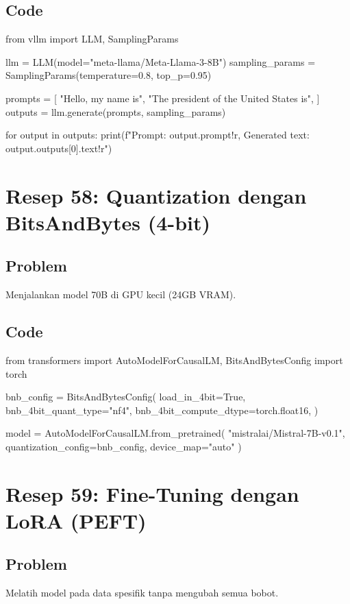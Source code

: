 \subsection*{Code}
\begin{codeblock}[language=Python]
from vllm import LLM, SamplingParams

llm = LLM(model="meta-llama/Meta-Llama-3-8B")
sampling_params = SamplingParams(temperature=0.8, top_p=0.95)

prompts = [
    "Hello, my name is",
    "The president of the United States is",
]
outputs = llm.generate(prompts, sampling_params)

for output in outputs:
    print(f"Prompt: {output.prompt!r}, Generated text: {output.outputs[0].text!r}")
\end{codeblock}

\newpage

\section{Resep 58: Quantization dengan BitsAndBytes (4-bit)}

\subsection*{Problem}
Menjalankan model 70B di GPU kecil (24GB VRAM).

\subsection*{Code}
\begin{codeblock}[language=Python]
from transformers import AutoModelForCausalLM, BitsAndBytesConfig
import torch

bnb_config = BitsAndBytesConfig(
    load_in_4bit=True,
    bnb_4bit_quant_type="nf4",
    bnb_4bit_compute_dtype=torch.float16,
)

model = AutoModelForCausalLM.from_pretrained(
    "mistralai/Mistral-7B-v0.1",
    quantization_config=bnb_config,
    device_map="auto"
)
\end{codeblock}

\newpage

\section{Resep 59: Fine-Tuning dengan LoRA (PEFT)}

\subsection*{Problem}
Melatih model pada data spesifik tanpa mengubah semua bobot.

